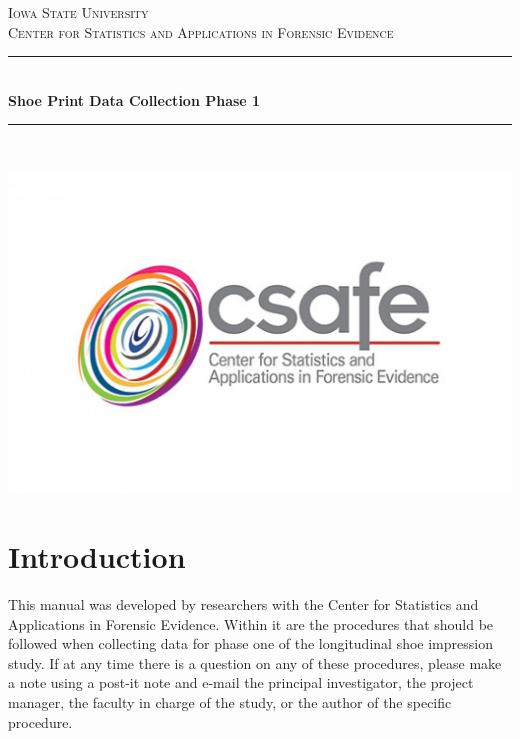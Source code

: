 \documentclass[12pt]{article}
\begin{document}
\begin{titlepage}

\newcommand{\HRule}{\rule{\linewidth}{0.5mm}}
\center 

\textsc{\LARGE Iowa State University }\\[1.5cm] 
\textsc{\Large Center for Statistics and Applications in Forensic
Evidence
}\\[0.5cm] 

\HRule \\[0.4cm]
{ \huge \bfseries Shoe Print Data Collection Phase 1 }\\[0.4cm] 
\HRule \\[1.5cm]



\begin{center}
\centering
\includegraphics[scale=.4]{csafe-logo}\\[1cm]
\end{center}







\end{titlepage}

\section{Introduction}

This manual was developed by researchers with the Center for Statistics and Applications in Forensic Evidence. Within it are the procedures that should be followed when collecting data for phase one of the longitudinal shoe impression study. If at any time there is a question on any of these procedures, please make a note using a post-it note and e-mail the principal investigator, the project  manager,  the  faculty  in  charge  of  the  study,  or  the  author  of  the specific procedure.
\end{document}
